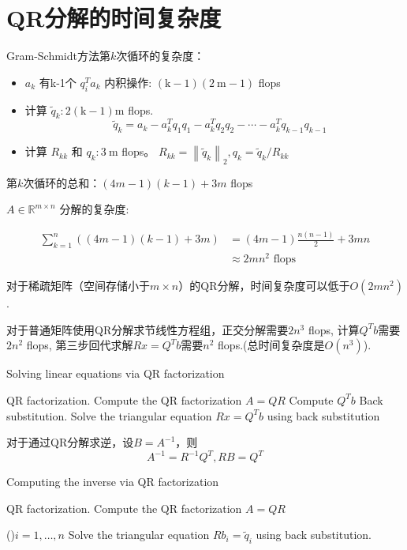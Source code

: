 \section{QR分解的时间复杂度}

Gram-Schmidt方法第$k$次循环的复杂度：

\begin{itemize}
    \item $ a_{k} $ 有k-1个 $ q_{i}^{T} a_{k} $ 内积操作: $ (\mathrm{k}-1)(2 \mathrm{~m}-1) $ flops
    \item 计算 $ \tilde{q}_{k}: 2(\mathrm{k}-1) \mathrm{m} $ flops. $$ \quad \tilde{q}_{k}=a_{k}-a_{k}^{T} q_{1} q_{1}-a_{k}^{T} q_{2} q_{2}-\cdots-a_{k}^{T} q_{k-1} q_{k-1} $$
    \item 计算 $ R_{k k} $ 和 $ q_{k}: 3 \mathrm{~m} $ flops。 $  R_{k k}=\left\|\tilde{q}_{k}\right\|_{2}, q_{k}=\tilde{q}_{k} / R_{k k} $
\end{itemize}

第$k$次循环的总和：$(4m-1)(k-1)+3m$ flops

$ A \in \mathbb{R}^{m \times n} $ 分解的复杂度:

$$ \begin{aligned} \sum_{k=1}^{n}((4 m-1)(k-1)+3 m) &=(4 m-1) \frac{n(n-1)}{2}+3 m n \\ & \approx 2 m n^{2} \text { flops } \end{aligned} $$

对于稀疏矩阵（空间存储小于$m \times n$）的QR分解，时间复杂度可以低于$O(2mn^2)$. 

对于普通矩阵使用QR分解求节线性方程组，正交分解需要$2 n^3$ flops, 计算$Q^T b$需要$2n^2$ flops, 第三步回代求解$Rx = Q^Tb$需要$n^2$ flops.(总时间复杂度是$O(n^3)$). 

\begin{algorithm}[htbp]
    \caption{Solving linear equations via QR factorization}
    QR factorization. Compute the QR factorization $ A=Q R $\;
    Compute $ Q^{T} b $\;
    Back substitution. Solve the triangular equation $ R x=Q^{T} b $ using back substitution\;
\end{algorithm}

\begin{theorem}
    对于通过QR分解求逆，设$ B=A^{-1} $，则$$ A^{-1}=R^{-1} Q^{T}, RB = Q^T $$
\end{theorem}


\begin{algorithm}[htbp]
    \caption{Computing the inverse via QR factorization}

    QR factorization. Compute the QR factorization $ A=Q R $\;

    \For(){$ i=1, \ldots, n $}{
        Solve the triangular equation $ R b_{i}=\tilde{q}_{i} $ using back substitution.
    }
\end{algorithm}


